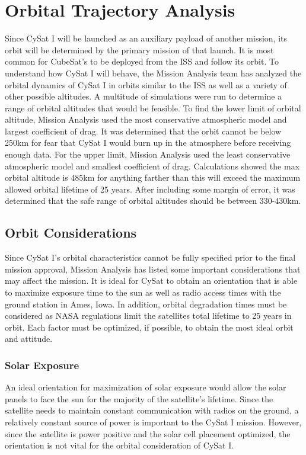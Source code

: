 \documentclass[nocover]            %
{CSLI}                       %
\begin{document}
\section{Orbital Trajectory Analysis}
Since CySat I will be launched as an auxiliary payload of another mission, its orbit will be determined by the primary mission of that launch. It is most common for CubeSat's to be deployed from the ISS and follow its orbit. To understand how CySat I will behave, the Mission Analysis team has analyzed the orbital dynamics of CySat I in orbits similar to the ISS as well as a variety of other possible altitudes. A multitude of simulations were run to determine a range of orbital altitudes that would be feasible. To find the lower limit of orbital altitude, Mission Analysis used the most conservative atmospheric model and largest coefficient of drag. It was determined that the orbit cannot be below 250km for fear that CySat I would burn up in the atmosphere before receiving enough data. For the upper limit, Mission Analysis used the least conservative atmospheric model and smallest coefficient of drag. Calculations showed the max orbital altitude is 485km for anything farther than this will exceed the maximum allowed orbital lifetime of 25 years. After including some margin of error, it was determined that the safe range of orbital altitudes should be between 330-430km.
\subsection{Orbit Considerations}
Since CySat I's orbital characteristics cannot be fully specified prior to the final mission approval, Mission Analysis has listed some important considerations that may affect the mission. It is ideal for CySat to obtain an orientation that is able to maximize exposure time to the sun as well as radio access times with the ground station in Ames, Iowa. In addition, orbital degradation times must be considered as NASA regulations limit the satellites total lifetime to 25 years in orbit. Each factor must be optimized, if possible, to obtain the most ideal orbit and attitude.
\subsubsection{Solar Exposure}
An ideal orientation for maximization of solar exposure would allow the solar panels to face the sun for the majority of the satellite's lifetime. Since the satellite needs to maintain constant communication with radios on the ground, a relatively constant source of power is important to the CySat I mission. However, since the satellite is power positive and the solar cell placement optimized, the orientation is not vital for the orbital consideration of CySat I.
\end{document}
